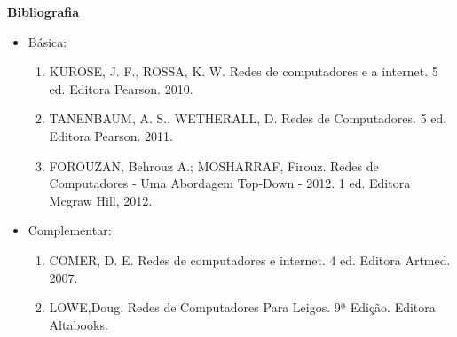 

   



\begin{snugshade}\begin{center}\textbf{
    Bibliografia
}\end{center}\end{snugshade}

\begin{itemize} 
  \item Básica:
	\begin{enumerate}
	\item KUROSE, J. F., ROSSA, K. W. Redes de computadores e a internet. 5 ed. Editora Pearson. 2010.
	\item TANENBAUM, A. S., WETHERALL, D. Redes de Computadores. 5 ed. Editora Pearson. 2011. 
	\item FOROUZAN, Behrouz A.; MOSHARRAF, Firouz. Redes de Computadores - Uma Abordagem Top-Down - 2012. 1 ed. Editora Mcgraw Hill, 2012.	
	\end{enumerate}
  \item Complementar:
	\begin{enumerate} 
	\item COMER, D. E. Redes de computadores e internet. 4 ed. Editora Artmed. 2007.
	\item LOWE,Doug. Redes de Computadores Para Leigos. 9ª Edição. Editora Altabooks.
	\end{enumerate}
\end{itemize}
